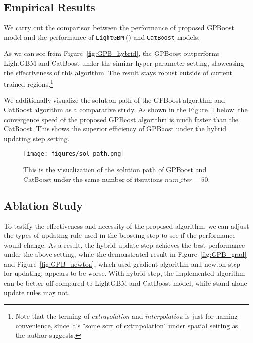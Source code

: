 \documentclass[12pt,a4paper]{article}
\begin{document}
\subsection{Empirical Results}

We carry out the comparison between the performance of proposed GPBoost model and the performance of \texttt{LightGBM} (\cite{Ke2017}) and \texttt{CatBoost} models.

As we can see from Figure~\ref{fig:GPB_hybrid}, the GPBoost outperforms LightGBM and CatBoost under the similar hyper parameter setting, showcasing the effectiveness of this algorithm. The result stays robust outside of current trained regions.\footnote{Note that the terming of \textit{extrapolation} and \textit{interpolation} is just for naming convenience, since it's "some sort of extrapolation" under spatial setting as the author suggests.}

We additionally visualize the solution path of the GPBoost algorithm and CatBoost algorithm as a comparative study. As shown in the Figure~\ref{fig:solution_path} below, the convergence speed of the proposed GPBoost algorithm is much faster than the CatBoost. This shows the superior efficiency of GPBoost under the hybrid updating step setting.

\begin{figure}
    \centering
    \texttt{[image: figures/sol\_path.png]}
    \caption{\small This is the visualization of the solution path of GPBoost and CatBoost under the same number of iterations $num\_iter = 50$. }
    \label{fig:solution_path}
\end{figure}

\subsection{Ablation Study}

To testify the effectiveness and necessity of the proposed algorithm, we can adjust the types of updating rule used in the boosting step to see if the performance would change. As a result, the hybrid update step achieves the best performance under the above setting, while the demonstrated result in Figure~\ref{fig:GPB_grad} and Figure~\ref{fig:GPB_newton}, which used gradient algorithm and newton step for updating, appears to be worse. With hybrid step, the implemented algorithm can be better off compared to LightGBM and CatBoost model, while stand alone update rules may not.
\end{document}

